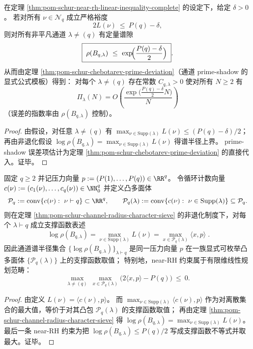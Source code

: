 \begin{corollary}\label{cor:pom-schur-near-rh-margin-propagation}
在定理 \ref{thm:pom-schur-near-rh-linear-inequality-complete} 的设定下，给定 \(\delta>0\)。
若对所有 \(\nu\in\mathcal{N}_q\) 成立严格裕度
\[
2L(\nu)\ \le\ P(q)-\delta,
\]
则对所有非平凡通道 \(\lambda\neq(q)\) 有定量谱隙
\[
\boxed{\;
\rho(B_{q,\lambda})\ \le\ \exp\!\Bigl(\frac{P(q)-\delta}{2}\Bigr)\; }.
\]
从而由定理 \ref{thm:pom-schur-chebotarev-prime-deviation}（通道 prime-shadow 的显式公式模板）得到：
对每个 \(\lambda\neq(q)\) 存在常数 \(C_{q,\lambda}>0\) 使对所有 \(N\ge2\) 有
\[
\boxed{\;
\Pi_\lambda(N)=O\!\left(\frac{\exp\!\bigl(\tfrac{P(q)-\delta}{2}N\bigr)}{N}\right)\;}
\]
（误差的指数率由 \(\rho(B_{q,\lambda})\) 控制）。
\end{corollary}
\begin{proof}
由假设，对任意 \(\lambda\neq(q)\) 有
\(
\max_{\nu\in\mathrm{Supp}(\lambda)}L(\nu)\le (P(q)-\delta)/2
\)；
再由非退化假设 \(\log\rho(B_{q,\lambda})=\max_{\nu\in\mathrm{Supp}(\lambda)}L(\nu)\) 得谱半径上界。
prime-shadow 误差项估计为定理 \ref{thm:pom-schur-chebotarev-prime-deviation} 的直接代入。证毕。
\end{proof}

\begin{corollary}\label{cor:pom-schur-pressure-polytope-shell}
固定 \(q\ge2\) 并记压力向量 \(p:=(P(1),\dots,P(q))\in\RR^q\)。
令循环计数向量
\(
c(\nu):=(c_1(\nu),\dots,c_q(\nu))\in\NN_0^q
\)
并定义凸多面体
\[
\mathcal{P}_q:=\mathrm{conv}\{c(\nu):\ \nu\vdash q\}\subset\RR^q,
\qquad
\mathcal{P}_q(\lambda):=\mathrm{conv}\{c(\nu):\ \nu\in\mathrm{Supp}(\lambda)\}\subseteq\mathcal{P}_q.
\]
则在定理 \ref{thm:pom-schur-channel-radius-character-sieve} 的非退化制度下，对每个 \(\lambda\vdash q\) 成立支撑函数表述
\[
\boxed{\;
\log\rho(B_{q,\lambda})
=
\max_{\nu\in\mathrm{Supp}(\lambda)}L(\nu)
=
\max_{x\in\mathcal{P}_q(\lambda)}\langle x,p\rangle\; }.
\]
因此通道谱半径集合
\(\{\log\rho(B_{q,\lambda})\}_{\lambda\vdash q}\)
是同一压力向量 \(p\) 在一族显式可枚举凸多面体 \(\{\mathcal{P}_q(\lambda)\}\) 上的支撑函数取值；
特别地，near-RH 约束属于有限维线性规划范畴：
\[
\max_{\lambda\neq(q)}\ \max_{x\in\mathcal{P}_q(\lambda)}\bigl(2\langle x,p\rangle-P(q)\bigr)\ \le\ 0.
\]
\end{corollary}
\begin{proof}
由定义 \(L(\nu)=\langle c(\nu),p\rangle\)。
而 \(\max_{\nu\in\mathrm{Supp}(\lambda)}\langle c(\nu),p\rangle\) 作为对离散集合的最大值，等价于对其凸包 \(\mathcal{P}_q(\lambda)\) 的支撑函数取值；
再由定理 \ref{thm:pom-schur-channel-radius-character-sieve} 得 \(\log\rho(B_{q,\lambda})=\max_{\nu\in\mathrm{Supp}(\lambda)}L(\nu)\)。
最后一条 near-RH 约束为把 \(\log\rho(B_{q,\lambda})\le P(q)/2\) 写成支撑函数不等式并取最大。证毕。
\end{proof}

